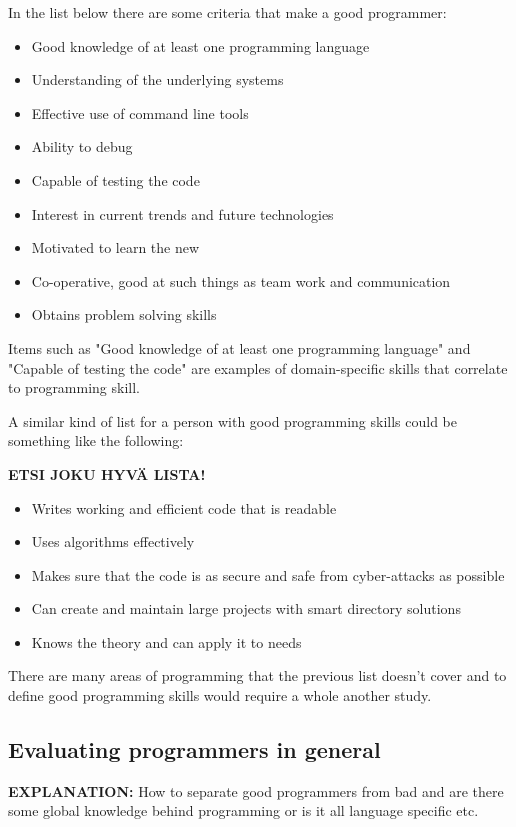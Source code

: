 \documentclass[11pt,a4paper,oneside,article]{memoir}
\begin{document}
In the list below there are some criteria that make a good programmer:
\vspace{-17pt} 
\begin{itemize}
\item Good knowledge of at least one programming language
\item Understanding of the underlying systems
\item Effective use of command line tools
\item Ability to debug
\item Capable of testing the code
\item Interest in current trends and future technologies
\item Motivated to learn the new
\item Co-operative, good at such things as team work and communication
\item Obtains problem solving skills
\end{itemize}
\vspace{-17pt}

Items such as "Good knowledge of at least one programming language" and "Capable of testing the code" are examples of domain-specific skills that correlate to programming skill.

A similar kind of list for a person with good programming skills could be something like the following:

\textbf{ETSI JOKU HYVÄ LISTA!}

\vspace{-17pt} 
\begin{itemize}
\item Writes working and efficient code that is readable
\item Uses algorithms effectively
\item Makes sure that the code is as secure and safe from cyber-attacks as possible
\item Can create and maintain large projects with smart directory solutions
\item Knows the theory and can apply it to needs
\end{itemize}
\vspace{-17pt}

There are many areas of programming that the previous list doesn't cover and to define good programming skills would require a whole another study. 

\subsection{Evaluating programmers in general}
\label{sec:evaluating}
\textbf{EXPLANATION:} How to separate good programmers from bad and are there some global knowledge behind programming or is it all language specific etc. %
\end{document}
